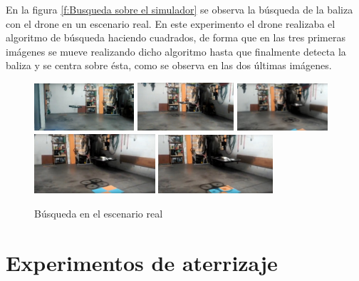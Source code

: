 En la figura \ref{f:Busqueda sobre el simulador} se observa la b\'usqueda de la baliza con el drone en un escenario real. En este experimento el drone realizaba el algoritmo de b\'usqueda haciendo cuadrados, de forma que en las tres primeras im\'agenes se mueve realizando dicho algoritmo hasta que finalmente detecta la baliza y se centra sobre \'esta, como se observa en las dos \'ultimas im\'agenes.
\begin{figure}[H]
 \centering
    \includegraphics[width=0.33\textwidth]{imgs/busqueda_real1.jpg}
    \includegraphics[width=0.32\textwidth]{imgs/busqueda_real3.jpg}
    \includegraphics[width=0.30\textwidth]{imgs/busqueda_real5.jpg}\\
    \includegraphics[width=0.4\textwidth]{imgs/busqueda_real6.jpg}
    \includegraphics[width=0.38\textwidth]{imgs/busqueda_real7.jpg}
 \caption{B\'usqueda en el escenario real}
 \label{f:Busqueda con el drone real}
\end{figure}


\section{Experimentos de aterrizaje}

